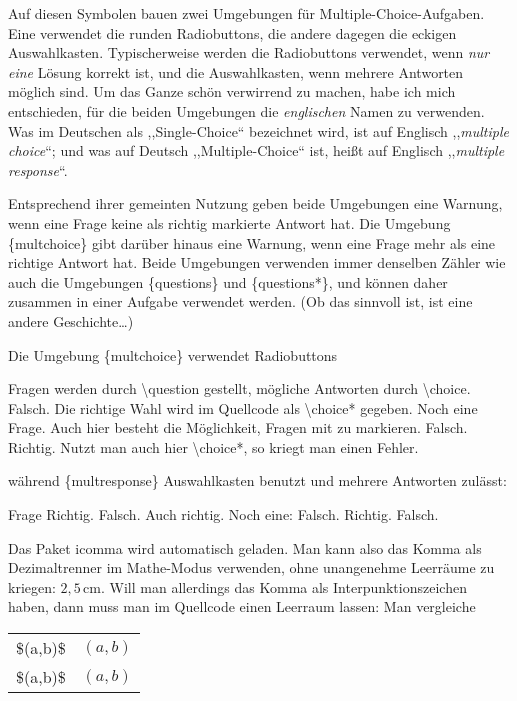\documentclass[hyperworksheet]{drcschool}
\newcommand*{\cs}[1]{\textup{\ttfamily\textbackslash#1}}                        %
\newcommand*{\pkg}[1]{\textup{\ttfamily#1}}                                     %
\newcommand*{\opt}[1]{\textup{\ttfamily#1}}                                     %
\newcommand*{\env}[1]{\textup{\ttfamily\{#1\}}}                                 %
\begin{document}
\begin{worksheet}
Auf diesen Symbolen bauen zwei Umgebungen für Multiple-Choice-Aufgaben. Eine
verwendet die runden Radiobuttons, die andere dagegen die eckigen Auswahlkasten.
Typischerweise werden die Radiobuttons verwendet, wenn \emph{nur eine} Lösung korrekt ist, und
die Auswahlkasten, wenn mehrere Antworten möglich sind. Um das Ganze schön verwirrend
zu machen, habe ich mich entschieden, für die beiden Umgebungen die \emph{englischen} Namen
zu verwenden. Was im Deutschen als ,,Single-Choice`` bezeichnet wird, ist auf Englisch
,,\emph{multiple choice}``; und was auf Deutsch ,,Multiple-Choice`` ist, heißt auf Englisch
,,\emph{multiple response}``.

Entsprechend ihrer gemeinten Nutzung geben beide Umgebungen eine Warnung,
wenn eine Frage keine als richtig markierte Antwort hat. Die Umgebung \env{multchoice}
gibt darüber hinaus eine Warnung, wenn eine Frage mehr als eine richtige Antwort
hat. Beide Umgebungen verwenden immer denselben Zähler wie auch die Umgebungen
\env{questions} und \env{questions*}, und können daher zusammen in einer Aufgabe
verwendet werden. (Ob das sinnvoll ist, ist eine andere Geschichte\ldots)

Die Umgebung \env{multchoice} verwendet Radiobuttons
\begin{multchoice}
\question Fragen werden durch \cs{question} gestellt,
   \choice mögliche Antworten durch \cs{choice}.
   \choice Falsch.
   \choice* Die richtige Wahl wird im Quellcode als \cs{choice*} gegeben.
\question* Noch eine Frage. Auch hier besteht die Möglichkeit, Fragen mit \opt{*} zu markieren.
   \choice Falsch.
   \choice* Richtig.
   \choice Nutzt man auch hier \cs{choice*}, so kriegt man einen Fehler.
\end{multchoice}
während \env{multresponse} Auswahlkasten benutzt und mehrere Antworten zulässt:
\begin{multresponse}
\question Frage
   \choice* Richtig.
   \choice Falsch.
   \choice* Auch richtig.
\question Noch eine:
   \choice Falsch.
   \choice* Richtig.
   \choice Falsch.
\end{multresponse}

Das Paket \pkg{icomma} wird automatisch geladen. Man kann also das Komma als Dezimaltrenner
im Mathe-Modus verwenden, ohne unangenehme Leerräume zu kriegen: $2,5\,\mathrm{cm}$.
Will man allerdings das Komma als Interpunktionszeichen haben, dann muss man im Quellcode
einen Leerraum lassen: Man vergleiche
\begin{tabular}[t]{l@{\space\textrightarrow\space}l}
\opt{\$(a,b)\$}  & $(a,b)$ \\
\opt{\$(a,\textvisiblespace b)\$} & $(a, b)$
\end{tabular}

\end{worksheet}
\end{document}
